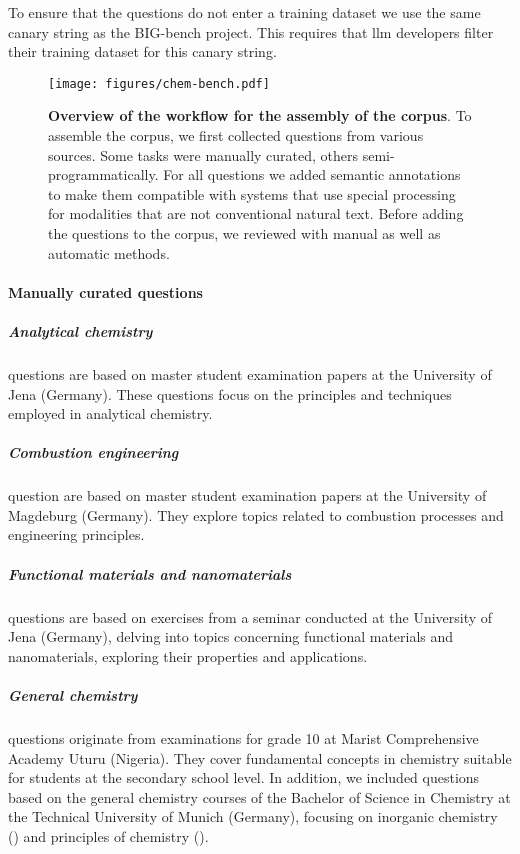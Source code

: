 \documentclass[11pt, oneside]{article}
\begin{document}
\begin{refsection}
To ensure that the questions do not enter a training dataset we use the same canary string as the BIG-bench project.
This requires that \Gls{llm} developers filter their training dataset for this canary string.\autocite{openai2024gpt4, srivastava2022beyond}

\begin{figure}[!h]
    \texttt{[image: figures/chem-bench.pdf]}
    \caption{\textbf{Overview of the workflow for the assembly of the \chembench corpus}. To assemble the \chembench corpus, we first collected questions from various sources. Some tasks were manually curated, others semi-programmatically. For all questions we added semantic annotations to make them compatible with systems that use special processing for modalities that are not conventional natural text. Before adding the questions to the corpus, we reviewed with manual as well as automatic methods.}
    \label{fig:curation_workflow}
\end{figure}

\paragraph{Manually curated questions}

\subparagraph{Analytical chemistry}
 questions are based on master student examination papers at the University of Jena (Germany). 
These questions focus on the principles and techniques employed in analytical chemistry.

\subparagraph{Combustion engineering}
 question are based on master student examination papers at the University of Magdeburg (Germany). 
They explore topics related to combustion processes and engineering principles.

\subparagraph{Functional materials and nanomaterials}
  questions are based on exercises from a seminar conducted at the University of Jena (Germany), delving into topics concerning functional materials and nanomaterials, exploring their properties and applications.

\subparagraph{General chemistry}
 questions originate from examinations for grade 10 at Marist Comprehensive Academy Uturu (Nigeria). 
They cover fundamental concepts in chemistry suitable for students at the secondary school level.
In addition, we included questions based on the general chemistry courses of the Bachelor of Science in Chemistry at the Technical University of Munich (Germany), focusing on inorganic chemistry () and principles of chemistry ().


\end{refsection}
\end{document}
